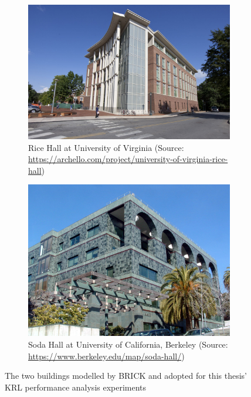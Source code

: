 \begin{figure}
    \centering
    \begin{subfigure}[b]{1\textwidth}
        \includegraphics[width=\textwidth]{figures/rice_hall.jpg}
         \caption{Rice Hall at University of Virginia \newline (Source: \url{https://archello.com/project/university-of-virginia-rice-hall})}
        \label{subfig:rice_hall}
    \end{subfigure}
    \hspace{0.05\textwidth}
    \begin{subfigure}[b]{1\textwidth}
        \includegraphics[width=\textwidth]{figures/Sodahall.jpeg}
        \caption{Soda Hall at University of California, Berkeley \newline (Source: \url{https://www.berkeley.edu/map/soda-hall/})}
               
        \label{subfig:soda_hall}
    \end{subfigure}
    \caption{The two buildings modelled by BRICK and adopted for this thesis' \ac{KRL} performance analysis experiments}
    \label{fig:buildings_modeled_by_BRICK}
\end{figure}

